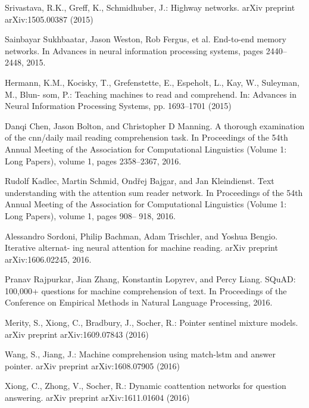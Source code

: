 \documentclass{article}
\begin{document}
\begin{multicols}{2}
\begin{thebibliography}{99}
    Srivastava, R.K., Greff, K., Schmidhuber, J.: Highway networks.
    arXiv preprint
    arXiv:1505.00387 (2015)

    Sainbayar Sukhbaatar, Jason Weston, Rob Fergus, et al. End-to-end memory networks. In
    Advances in neural information processing systems, pages 2440–2448, 2015.

    Hermann, K.M., Kocisky, T., Grefenstette, E., Espeholt, L., Kay, W., Suleyman, M., Blun-
    som, P.: Teaching machines to read and comprehend. In: Advances in Neural Information
    Processing Systems, pp. 1693–1701 (2015)

    Danqi Chen, Jason Bolton, and Christopher D Manning. A thorough examination of the
    cnn/daily mail reading comprehension task. In Proceedings of the 54th Annual Meeting of
    the Association for Computational Linguistics (Volume 1: Long Papers), volume 1, pages
    2358–2367, 2016.

    Rudolf Kadlec, Martin Schmid, Ondřej Bajgar, and Jan Kleindienst. Text understanding
    with the attention sum reader network. In Proceedings of the 54th Annual Meeting of the
    Association for Computational Linguistics (Volume 1: Long Papers), volume 1, pages 908–
    918, 2016.

    Alessandro Sordoni, Philip Bachman, Adam Trischler, and Yoshua Bengio. Iterative alternat-
    ing neural attention for machine reading. arXiv preprint arXiv:1606.02245, 2016.

    Pranav Rajpurkar, Jian Zhang, Konstantin Lopyrev, and Percy Liang. SQuAD: 100,000+ questions
    for machine comprehension of text. In Proceedings of the Conference on Empirical Methods in
    Natural Language Processing, 2016.

    Merity, S., Xiong, C., Bradbury, J., Socher, R.: Pointer sentinel mixture models. arXiv
    preprint arXiv:1609.07843 (2016)

    Wang, S., Jiang, J.: Machine comprehension using match-lstm and answer pointer. arXiv
    preprint arXiv:1608.07905 (2016)

    Xiong, C., Zhong, V., Socher, R.: Dynamic coattention networks for question answering.
    arXiv preprint arXiv:1611.01604 (2016)


\end{thebibliography}
\end{multicols}
\end{document}
